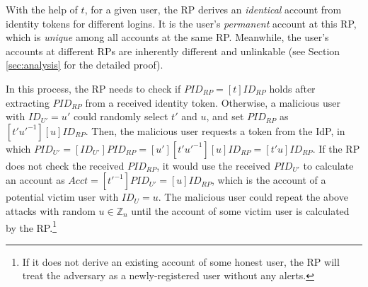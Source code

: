 %
%

With the help of $t$, for a given user, the RP derives an \emph{identical} account from identity tokens for different logins. It is the user's \emph{permanent} account at this RP, which is \emph{unique} among all accounts at the same RP. Meanwhile, the user's accounts at different RPs are inherently different and unlinkable (see Section \ref{sec:analysis} for the detailed proof).

\newc
In this process, the RP needs to check if $PID_{RP} = [t]ID_{RP}$ holds after extracting $PID_{RP}$ from a received identity token. Otherwise, a malicious user with $ID_{U'} = u'$ could randomly select $t'$ and $u$, and set $PID_{RP}$ as $[t'u'^{-1}][u]ID_{RP}$. Then, the malicious user requests a token from the IdP, in which $PID_{U'} = [ID_{U'}]PID_{RP}=[u'][t'u'^{-1}][u]ID_{RP} = [t'u]ID_{RP}$.
If the RP does not check the received $PID_{RP}$, it would use the received $PID_{U'}$ to calculate an account as $Acct = [t'^{-1}]PID_{U'}=[u]ID_{RP}$, which is the account of a potential victim user with $ID_{U} = u$.
The malicious user could repeat the above attacks with random $u \in \mathbb{Z}_n$ until the account of some victim user is calculated by the RP.\footnote{\newc If it does not derive an existing account of some honest user, the RP will treat the adversary as a newly-registered user without any alerts.}

